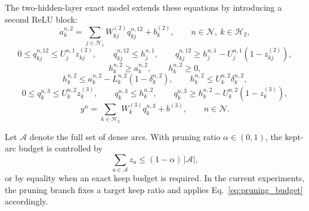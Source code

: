 The two-hidden-layer exact model extends these equations by introducing a second ReLU block:
\begin{equation}
    a_{k}^{n,2} = \sum_{j\in\mathcal{H}_1} W_{kj}^{(2)} q_{kj}^{n,12} + b_k^{(2)},
    \qquad n\in\mathcal{N},\ k\in\mathcal{H}_2,
    \label{eq:pruning_two_layer_affine}
\end{equation}
\begin{equation}
    0 \le q_{kj}^{n,12} \le U_{j}^{n,1} z_{kj}^{(2)}, \qquad
    q_{kj}^{n,12} \le h_j^{n,1}, \qquad
    q_{kj}^{n,12} \ge h_j^{n,1} - U_{j}^{n,1}\left(1-z_{kj}^{(2)}\right),
    \label{eq:pruning_two_layer_product12}
\end{equation}
\begin{equation}
    h_{k}^{n,2} \ge a_{k}^{n,2}, \qquad
    h_{k}^{n,2} \ge 0,
    \label{eq:pruning_two_layer_relu_lower}
\end{equation}
\begin{equation}
    h_{k}^{n,2} \le a_{k}^{n,2} - L_{k}^{n,2}\left(1-\delta_{k}^{n,2}\right), \qquad
    h_{k}^{n,2} \le U_{k}^{n,2}\delta_{k}^{n,2},
    \label{eq:pruning_two_layer_relu_upper}
\end{equation}
\begin{equation}
    0 \le q_k^{n,3} \le U_{k}^{n,2} z_k^{(3)}, \qquad
    q_k^{n,3} \le h_k^{n,2}, \qquad
    q_k^{n,3} \ge h_k^{n,2} - U_{k}^{n,2}\left(1-z_k^{(3)}\right),
    \label{eq:pruning_two_layer_product23}
\end{equation}
\begin{equation}
    y^n = \sum_{k\in\mathcal{H}_2} W_{k}^{(3)} q_k^{n,3} + b^{(3)},
    \qquad n\in\mathcal{N}.
    \label{eq:pruning_two_layer_output}
\end{equation}

Let $\mathcal{A}$ denote the full set of dense arcs. With pruning ratio $\alpha\in(0,1)$, the kept-arc budget is controlled by
\begin{equation}
    \sum_{a\in\mathcal{A}} z_a \le (1-\alpha)\,|\mathcal{A}|,
    \label{eq:pruning_budget}
\end{equation}
or by equality when an exact keep budget is required. In the current experiments, the pruning branch fixes a target keep ratio and applies Eq.~\eqref{eq:pruning_budget} accordingly.

